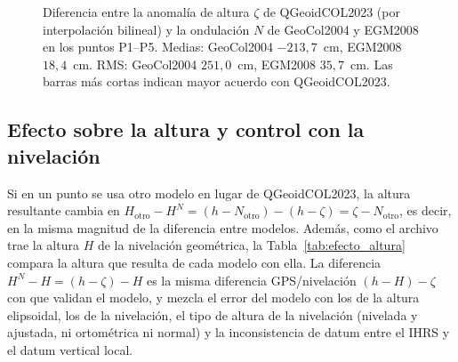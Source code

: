 \documentclass[11pt,letterpaper]{article}
\begin{document}
\begin{figure}[htbp]
\centering
{}
\caption{Diferencia entre la anomalía de altura $\zeta$ de QGeoidCOL2023 (por
interpolación bilineal) y la ondulación $N$ de GeoCol2004 y EGM2008 en los puntos
P1--P5. Medias: GeoCol2004 $-213{,}7$~cm, EGM2008 $18{,}4$~cm. RMS: GeoCol2004
$251{,}0$~cm, EGM2008 $35{,}7$~cm. Las barras más cortas indican mayor acuerdo
con QGeoidCOL2023.}
\label{fig:tabla17}
\end{figure}


\subsection{Efecto sobre la altura y control con la nivelación}
\label{sec:control}
Si en un punto se usa otro modelo en lugar de QGeoidCOL2023, la altura resultante cambia en
$H_{\text{otro}}-H^N=(h-N_{\text{otro}})-(h-\zeta)=\zeta-N_{\text{otro}}$, es decir, en la misma
magnitud de la diferencia entre modelos. Además, como el archivo trae la altura $H$ de la
nivelación geométrica, la Tabla~\ref{tab:efecto_altura} compara la altura que resulta de cada
modelo con ella. La diferencia $H^N-H=(h-\zeta)-H$ es la misma diferencia GPS/nivelación $(h-H)-\zeta$ con que
\citet{liu2024} validan el modelo, y mezcla el error del modelo con los de la altura elipsoidal, los de la nivelación, el tipo de altura de la
nivelación (nivelada y ajustada, ni ortométrica ni normal) y la inconsistencia de datum entre el IHRS y el datum
vertical local.
\end{document}
